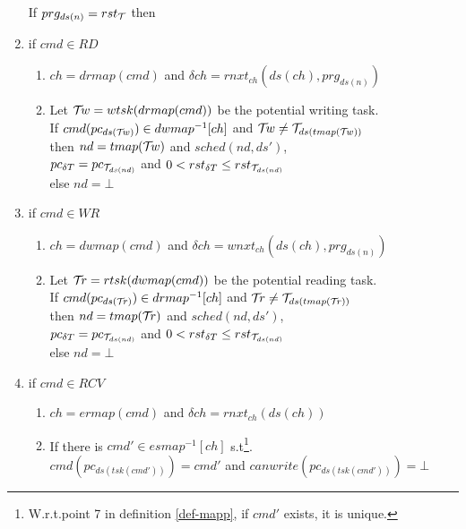 \documentclass{article}
\begin{document}
\begin{definition}
\begin{enumerate}
			
			\vspace{1mm}
			\hspace{-10mm} If $prg_{ds(n)}= rst_{\cal T}$ then
			
			\vspace{1mm}	
\item if $cmd\in RD$
      \begin{enumerate}
			\item $ch=drmap(cmd)$ and $\delta ch=rnxt_{ch}(ds(ch),prg_{ds(n)})$
			\item Let ${\cal T}\!w=wtsk(drmap(cmd))$ be the potential writing task.\\ 
				If $cmd(pc_{ds({\cal T}\!w)})\in dwmap^{-1}[ch]$ and 
				   ${\cal T}\!w\neq {\cal T}_{ds(tmap({\cal T}\!w))}$\\
				then $nd=tmap({\cal T}\!w)$ and $sched(nd,ds')$,\\
				     \hspace*{0.8cm}$pc_{\delta T}=pc_{{\cal T}_{ds(nd)}}$ and $0<rst_{\delta T}\leq rst_{{\cal T}_{ds(nd)}}$\\
				else $nd=\bot$
			\end{enumerate}
\item if $cmd\in W\!R$
      \begin{enumerate}
			\item $ch=dwmap(cmd)$ and $\delta ch=wnxt_{ch}(ds(ch),prg_{ds(n)})$
			\item Let ${\cal T}\!r=rtsk(dwmap(cmd))$ be the potential reading task.\\ 
				If $cmd(pc_{ds({\cal T}\!r)})\in drmap^{-1}[ch]$ and 
				   ${\cal T}\!r\neq {\cal T}_{ds(tmap({\cal T}\!r))}$\\
				then $nd=tmap({\cal T}\!r)$ and $sched(nd,ds')$,\\
				     \hspace*{0.8cm}$pc_{\delta T}=pc_{{\cal T}_{ds(nd)}}$ and $0<rst_{\delta T}\leq rst_{{\cal T}_{ds(nd)}}$\\
				else $nd=\bot$
			\end{enumerate}
\item if $cmd\in RCV$
      \begin{enumerate}
			\item $ch=ermap(cmd)$ and $\delta ch=rnxt_{ch}(ds(ch))$
			\item If there is $cmd'\in esmap^{-1}[ch]$ s.t\footnote{W.r.t.point 7 in definition \ref{def-mapp}, if $cmd'$ exists, it is unique.}.\\ \hspace*{3mm}
			$cmd(pc_{ds(tsk(cmd'))})=cmd'$ and $canwrite(pc_{ds(tsk(cmd'))})=\bot$\\

\end{enumerate}
\end{enumerate}
\end{definition}
\end{document}
